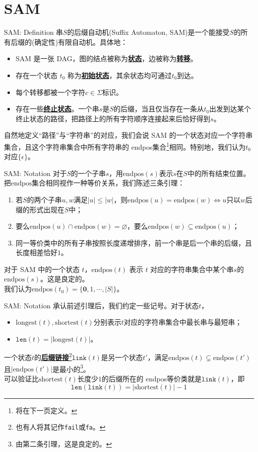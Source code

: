 \documentclass{beamer}
\theoremstyle{compact}
\def\obj#1{\textbf{\uline{#1}}}
\def\le{\leqslant}
\def\endpos{\textrm{endpos}}
\def\link{\texttt{link}}
\def\len{\texttt{len}}
\begin{document}
\section{SAM}
\begin{frame}{SAM: Definition}
	串$S$的后缀自动机(Suffix Automaton, SAM)是一个能接受$S$的所有后缀的(确定性)有限自动机。具体地：
	\begin{itemize}
		\item SAM 是一张 DAG，图的结点被称为\obj{状态}，边被称为\obj{转移}。
		\item 存在一个状态 $t_0$ 称为\obj{初始状态}，其余状态均可通过$t_0$到达。
		\item 每个转移都被一个字符$c \in \Sigma$标识。
		\item 存在一些\obj{终止状态}。一个串$s$是$S$的后缀，当且仅当存在一条从$t_0$出发到达某个终止状态的路径，把路径上的所有字符顺序连接起来后恰好得到$s$。
	\end{itemize}

	自然地定义“路径”与“字符串”的对应，我们会说 SAM 的一个状态对应一个字符串集合，且这个字符串集合中所有字符串的 \endpos 集合\footnote{\tiny 将在下一页定义。}相同。特别地，我们认为$t_0$对应$\{\epsilon\}$。
\end{frame}
\begin{frame}{SAM: Notation}
	对于$S$的一个子串$s$，用$\endpos(s)$表示$s$在$S$中的所有结束位置。把$\endpos$集合相同视作一种等价关系，我们陈述三条引理：
	\begin{enumerate}
		\item 若$S$的两个子串$u, w$满足$|u| \le |w|$，则$\endpos(u) = \endpos(w) \Leftrightarrow u $只以$w$后缀的形式出现在$S$中；
		\item 要么$\endpos(u) \cap \endpos(w) = \varnothing$，要么$\endpos(w) \subseteq \endpos(u)$；
		\item 同一等价类中的所有子串按照长度递增排序，前一个串是后一个串的后缀，且长度相差恰好$1$。
	\end{enumerate}

	对于 SAM 中的一个状态 $t$，$\endpos(t)$ 表示 $t$ 对应的字符串集合中某个串$s$的$\endpos(s)$。这是良定的。\\

	我们认为$\endpos(t_0) = \{\mathbf{0}, 1, \cdots, |S|\}$。

\end{frame}
\begin{frame}{SAM: Notation}
	承认前述引理后，我们约定一些记号。对于状态$t$，
	\begin{itemize}
		\item $\mathrm{longest}(t), \mathrm{shortest}(t)$分别表示$t$对应的字符串集合中最长串与最短串；
		\item $\len(t) = |\mathrm{longest}(t)|$。
	\end{itemize}

	一个状态$t$的\obj{后缀链接}\footnote{\tiny 也有人将其记作\texttt{fail}或\texttt{fa}。}$\link(t)$是另一个状态$t'$，满足$\endpos(t) \subsetneq \endpos(t')$且$|\endpos(t')|$是最小的\footnote{\tiny 由第二条引理，这是良定的。}。\\
	
	可以验证比$\mathrm{shortest}(t)$长度少$1$的后缀所在的 \endpos 等价类就是$\link(t)$，即$$\len(\link(t)) = |\mathrm{shortest}(t)| - 1$$
\end{frame}
\end{document}
